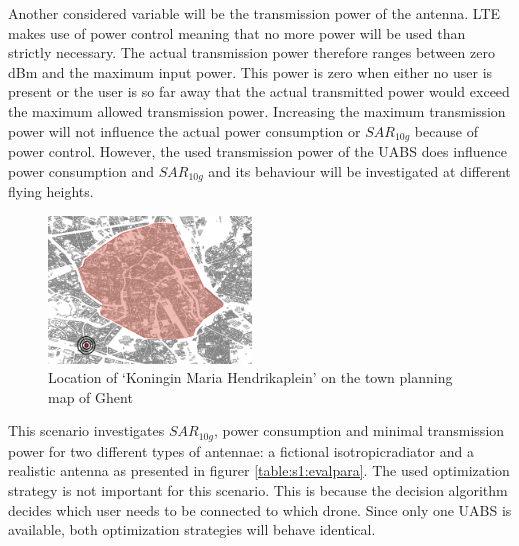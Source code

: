 Another considered variable will be the transmission power of the antenna.
\gls{LTE} makes use of power control meaning that no more power will be used than strictly necessary. The actual 
transmission power therefore ranges between zero dBm and the maximum input power. This power is zero when either no user is 
present or the user is so far away that the actual transmitted power would exceed the maximum allowed transmission power.
Increasing the maximum transmission power will not influence the actual power consumption or $SAR_{10g}$ because 
of power control. However, the used transmission power of the \gls{UABS}
does influence power consumption and $SAR_{10g}$ and its behaviour will be investigated at different flying heights.

\begin{figure}
  \begin{center}
    \includegraphics[width=0.48\textwidth]{../images/mariahendrikapleinB.png}
  \end{center}
 \caption{Location of `Koningin Maria Hendrikaplein' on the town planning map of Ghent}
  \label{fig:locationHendrikaplein}
\end{figure}
This scenario investigates $SAR_{10g}$, power consumption and minimal transmission power for two different types of antennae: a 
 fictional \gls{isotropicradiator} and a realistic antenna as presented in figurer \ref{table:s1:evalpara}.
 The used optimization strategy is not important
for this scenario.
This is because the
 decision algorithm decides which user needs to be connected to which drone. Since only one \gls{UABS} is available,
 both optimization strategies will behave identical. 

